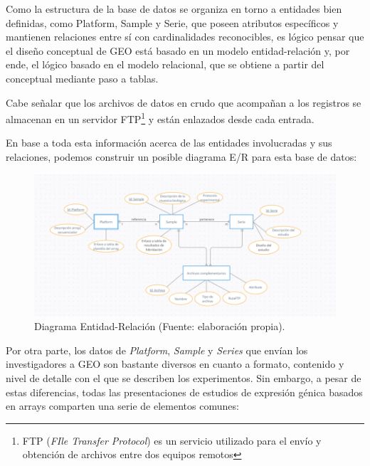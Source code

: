 Como la estructura de la base de datos se organiza en torno a entidades bien definidas, como Platform, Sample y Serie, que poseen atributos específicos
y mantienen relaciones entre sí con cardinalidades reconocibles, es lógico pensar que el diseño conceptual de GEO está basado en un modelo entidad-relación
y, por ende, el lógico basado en el modelo relacional, que se obtiene a partir del conceptual mediante paso a tablas. \newline

Cabe señalar que los archivos de datos en crudo que acompañan a los registros se almacenan en un servidor FTP\footnote{FTP (\textit{FIle Transfer Protocol}) 
es un servicio utilizado para el envío y obtención de archivos entre dos equipos remotos} y están enlazados desde cada entrada. \newline


En base a toda esta información acerca de las entidades involucradas y sus relaciones, podemos construir un posible diagrama E/R para esta base de datos:

\begin{figure}[h]
    \centering
    \includegraphics[width=1\textwidth]{../img/diagramaER.png}
    \caption{Diagrama Entidad-Relación (Fuente: elaboración propia).}
\end{figure}



Por otra parte, los datos de \textit{Platform}, \textit{Sample} y \textit{Series} que envían los investigadores a GEO son bastante diversos en cuanto a formato, 
contenido y nivel de detalle con el que se describen los experimentos. Sin embargo, a pesar de estas diferencias, todas las presentaciones de estudios de expresión 
génica basados en arrays comparten una serie de elementos comunes:

